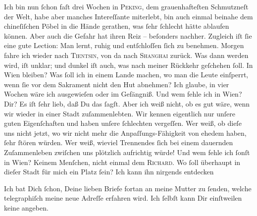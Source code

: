 \pstart
           Ich bin nun ſchon faſt drei Wochen in \textsc{Peking}, dem grauenhafteſten Schmutzneſt der Welt, habe aber manches Intereſſante
               miterlebt, bin auch einmal beinahe dem chineſiſchen Pöbel in die Hände gerathen, was ſehr ſchlecht
               hätte ablaufen können. Aber auch die Gefahr hat ihren Reiz – beſonders \strikeout{\textcolor{gray}{×}\-\textcolor{gray}{×}\-\textcolor{gray}{×}} nachher. Zugleich iſt ſie eine gute Lection: Man lernt, ruhig und entſchloſſen
               ſich zu benehmen. Morgen fahre {\pb}ich wieder nach \textsc{Tientsin}, von da nach \textsc{Shanghai} zurück. Was dann werden wird, iſt unklar; und dunkel iſt auch, was nach meiner
               Rückkehr geſchehen ſoll. In Wien bleiben? Was ſoll
               ich in einem Lande machen, wo
               man die Leute einſperrt, wenn ſie vor dem Sakrament nicht den Hut abnehmen? Ich
               glaube, in vier Wochen wäre ich ausgewieſen oder im Gefängniß. Und wem fehle ich in
                  Wien? Dir? Es iſt ſehr lieb, daß Du das ſagſt.
               Aber ich \strikeout{\textcolor{gray}{×}} weiß nicht, ob es gut wäre, wenn wir wieder in einer Stadt {\pb}zuſammenlebten. Wir kennen eigentlich nur unſere
               guten Eigenſchaften und haben unſere ſchlechten vergeſſen. Wer weiß,  ob dieſe uns nicht jetzt, wo wir nicht mehr die
               Anpaſſungs-Fähigkeit von ehedem haben, ſehr ſtören  würden. Wer weiß,  wieviel
               Trennendes ſich bei einem dauernden Zuſammenleben zwiſchen uns plötzlich aufrichtig
               würde! Und wem fehle ich ſonſt in Wien? Keinem
               Menſchen, nicht einmal dem \textsc{Richard}. Wo ſoll überhaupt in dieſer Stadt für mich ein Platz ſein? Ich kann ihn nirgends entdecken{\dotsfive}\pend
           
\pstart
           Ich  bat Dich ſchon, Deine {\pb}lieben Briefe fortan
               an meine Mutter zu ſenden,
               welche telegraphiſch meine neue Adreſſe erfahren wird. Ich ſelbſt kann Dir
               einſtweilen keine angeben.\pend
           
